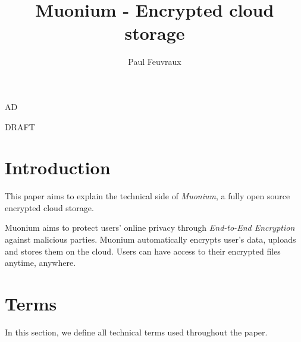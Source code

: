 AD\documentclass[a4paper,10pt]{article}
\title{Muonium - Encrypted cloud storage}
\author{Paul Feuvraux}
\begin{document}
\maketitle

DRAFT


\section{Introduction}
This paper aims to explain the technical side of \emph{Muonium}, a fully open source encrypted cloud storage.


Muonium aims to protect users' online privacy through \emph{End-to-End Encryption} against malicious parties.
Muonium automatically encrypts user's data, uploads and stores them on the cloud. Users can have access to their encrypted files anytime, anywhere.

\section{Terms}
In this section, we define all technical terms used throughout the paper.
\end{document}
